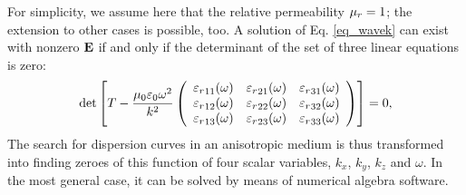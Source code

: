 For simplicity, we assume here that the relative permeability $\mu_r = 1$; the extension to other cases is possible, too. %
A solution of Eq. \ref{eq_wavek} can exist with nonzero $\mathbf{E}$ if and only if the determinant of the set of three linear equations is zero:
\begin{equation} 
\det\left[
T -
	\frac{\mu_0 \varepsilon_0 \omega^2}{k^2}
	\left(\begin{array}{ccc} 
	{\varepsilon_r}_{11}(\omega) & {\varepsilon_r}_{21}(\omega) & {\varepsilon_r}_{31}(\omega)  \\
	{\varepsilon_r}_{12}(\omega) & {\varepsilon_r}_{22}(\omega) & {\varepsilon_r}_{32}(\omega)  \\
	{\varepsilon_r}_{13}(\omega) & {\varepsilon_r}_{23}(\omega) & {\varepsilon_r}_{33}(\omega)  
	\end{array} \right) \right] = 0, \label{eq_dispdet}\end{equation}
The search for dispersion curves in an anisotropic medium is thus transformed into finding zeroes of this function of four scalar variables, $k_x$, $k_y$, $k_z$ and $\omega$.
In the most general case, it can be solved by means of numerical algebra software. 

